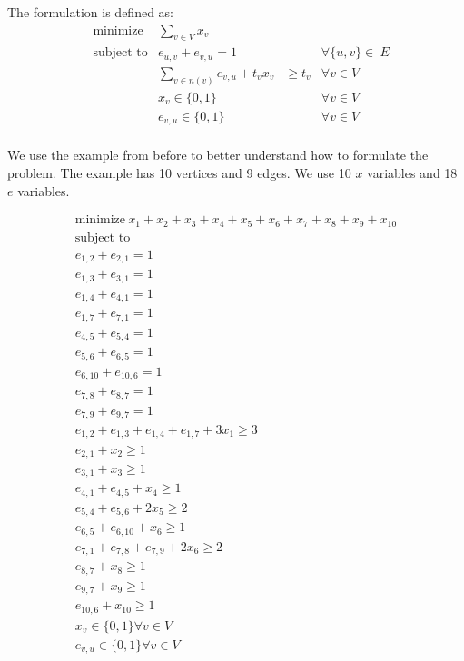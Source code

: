 The formulation is defined as:
\begin{equation*}
	\begin{aligned}
	& {\text{minimize}}&\sum_{v\in V}{x_{v}}\\ 
	&\text{subject to} & e_{u,v}+e_{v,u}=1  &&\forall\{u,v\}\in\ E \\
	& & \sum_{v\in n(v)} e_{v,u} + t_{v} x_{v}& \geq t_{v} & \forall v \in V\\
	& &x_{v} \in \{0,1\}  & & \forall v \in V\\
	& &e_{v,u}\in \{0,1\}  & & \forall v \in V\\
	\end{aligned}
\end{equation*}

We use the example from before to better understand how to formulate the problem. The example has 10 vertices and 9 edges. We use 10 $x$ variables and 18 $e$ variables. 

\begin{equation*}
	\begin{aligned}
	&&& {\text{minimize}} \ x_{1}+x_{2}+x_{3}+x_{4}+x_{5}+x_{6}+x_{7}+x_{8}+x_{9}+x_{10}&&&\\ 
	&&&\text{subject to} && \\
	&&&e_{1,2}+e_{2,1}=1&&&\\
	&&&e_{1,3}+e_{3,1}=1&&&\\
	&&&e_{1,4}+e_{4,1}=1&&&\\
	&&&e_{1,7}+e_{7,1}=1&&&\\
	&&&e_{4,5}+e_{5,4}=1&&&\\
	&&&e_{5,6}+e_{6,5}=1&&&\\
	&&&e_{6,10}+e_{10,6}=1&&&\\
	&&&e_{7,8}+e_{8,7}=1&&&\\
	&&&e_{7,9}+e_{9,7}=1&&&\\	
	&&& e_{1,2}+e_{1,3}+e_{1,4}+e_{1,7}+3x_{1}\geq 3&&&\\
	&&& e_{2,1} + x_{2}\geq 1&&&\\
	&&& e_{3,1} + x_{3}\geq 1&&&\\
	&&& e_{4,1} + e_{4,5} + x_{4}\geq 1&&&\\
	&&& e_{5,4} + e_{5,6} + 2 x_{5}\geq 2&&&\\
	&&& e_{6,5} + e_{6,10} + x_{6}\geq 1&&&\\
	&&& e_{7,1} + e_{7,8} + e_{7,9} + 2 x_{6}\geq 2&&&\\
	&&& e_{8,7} + x_{8}\geq 1&&&\\
	&&& e_{9,7} + x_{9}\geq 1&&&\\
	&&& e_{10,6} + x_{10}\geq 1&&&\\
	&& &x_{v} \in \{0,1\}  \forall v \in V&&&\\
	&& &e_{v,u}\in \{0,1\}  \forall v \in V &&&\\
	\end{aligned}
\end{equation*}

